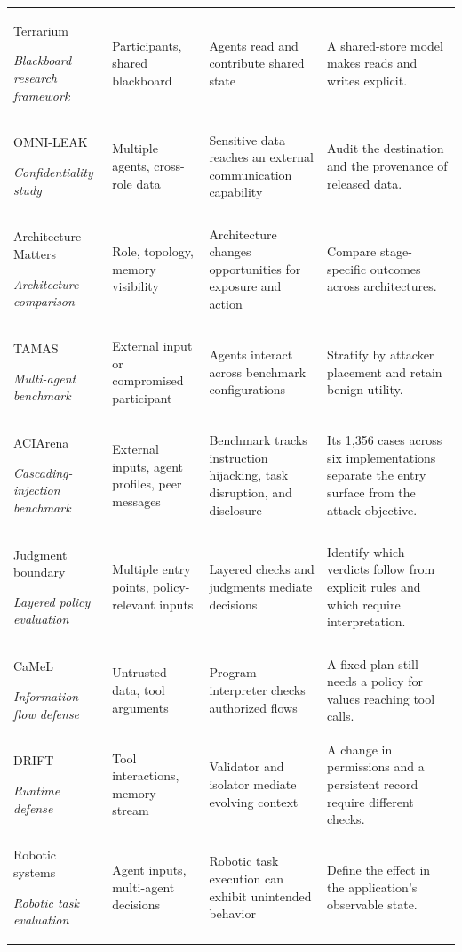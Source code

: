 \documentclass[11pt]{article}
\begin{document}
\begin{longtable}{@{}p{.19\linewidth}@{\hspace{.02\linewidth}}p{.22\linewidth}@{\hspace{.02\linewidth}}p{.24\linewidth}@{\hspace{.02\linewidth}}p{.28\linewidth}@{}}
Terrarium~\citep{Nakamura2025TerrariumRTAR}\par{\footnotesize\itshape Blackboard research framework} & Participants, shared blackboard & Agents read and contribute shared state & A shared-store model makes reads and writes explicit.\\[3pt]
OMNI-LEAK~\citep{naik2026omnileak}\par{\footnotesize\itshape Confidentiality study} & Multiple agents, cross-role data & Sensitive data reaches an external communication capability & Audit the destination and the provenance of released data.\\[3pt]
Architecture Matters~\citep{hagag2026architecture}\par{\footnotesize\itshape Architecture comparison} & Role, topology, memory visibility & Architecture changes opportunities for exposure and action & Compare stage-specific outcomes across architectures.\\[3pt]
TAMAS~\citep{kavathekar2025tamas}\par{\footnotesize\itshape Multi-agent benchmark} & External input or compromised participant & Agents interact across benchmark configurations & Stratify by attacker placement and retain benign utility.\\[3pt]
ACIArena~\citep{An2026ACIArenaTUH}\par{\footnotesize\itshape Cascading-injection benchmark} & External inputs, agent profiles, peer messages & Benchmark tracks instruction hijacking, task disruption, and disclosure & Its 1,356 cases across six implementations separate the entry surface from the attack objective.\\[3pt]
Judgment boundary~\citep{Mitra2026WhereREC}\par{\footnotesize\itshape Layered policy evaluation} & Multiple entry points, policy-relevant inputs & Layered checks and judgments mediate decisions & Identify which verdicts follow from explicit rules and which require interpretation.\\[3pt]
CaMeL~\citep{debenedetti2025camel}\par{\footnotesize\itshape Information-flow defense} & Untrusted data, tool arguments & Program interpreter checks authorized flows & A fixed plan still needs a policy for values reaching tool calls.\\[3pt]
DRIFT~\citep{li2025drift}\par{\footnotesize\itshape Runtime defense} & Tool interactions, memory stream & Validator and isolator mediate evolving context & A change in permissions and a persistent record require different checks.\\[3pt]
Robotic systems~\citep{Nagaraja2026WhenPCBF}\par{\footnotesize\itshape Robotic task evaluation} & Agent inputs, multi-agent decisions & Robotic task execution can exhibit unintended behavior & Define the effect in the application's observable state.\\[3pt]
\hline\end{longtable}
\end{document}
